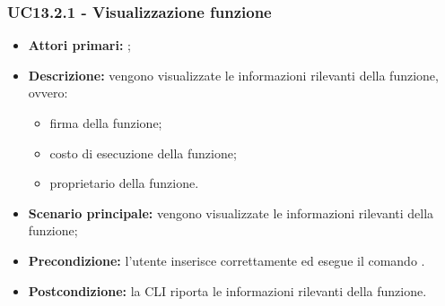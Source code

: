 \subsubsection{UC13.2.1 - Visualizzazione funzione}
\begin{itemize}
	\item \textbf{Attori primari:} \us{};
	\item \textbf{Descrizione:} vengono visualizzate le informazioni rilevanti della funzione, ovvero:
	\begin{itemize}
		\item firma della funzione;
		\item costo di esecuzione della funzione;
		\item proprietario della funzione. 
	\end{itemize}
	\item \textbf{Scenario principale:} vengono visualizzate le informazioni rilevanti della funzione;
	\item \textbf{Precondizione:} l'utente inserisce correttamente ed esegue il comando \plista{}.
	\item \textbf{Postcondizione:} la CLI riporta le informazioni rilevanti della funzione.
\end{itemize}